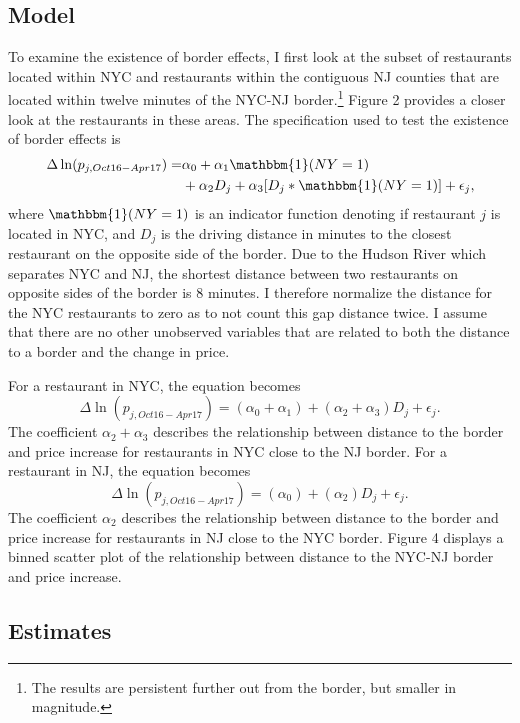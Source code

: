 \documentclass[11pt]{article}
\begin{document}
\subsection{Model}
 To examine the existence of border effects, I first look at the subset of restaurants located within NYC and restaurants within the contiguous NJ counties that are located within twelve minutes of the NYC-NJ border.\footnote{The results are persistent further out from the border, but smaller in magnitude.} Figure 2 provides a closer look at the restaurants in these areas. The specification used to test the existence of border effects is  
\begin{equation}
\begin{split}
\Delta \ln (p_{j,Oct16-Apr17})  = & \alpha_0 + \alpha_1  \mathbbm{1}(NY=1)  \\
& + \alpha_2 D_{j} + \alpha_3[D_j * \mathbbm{1}(NY=1)]  + \epsilon_{j}, 
\end{split}
\end{equation}
where  $\mathbbm{1}(NY=1)$ is an indicator function denoting if restaurant $j$ is located in NYC, and $D_j$ is the driving distance in minutes to the closest restaurant on the opposite side of the border. Due to the Hudson River which separates NYC and NJ, the shortest distance between two restaurants on opposite sides of the border is 8 minutes. I therefore normalize the distance for the NYC restaurants to zero as to not count this gap distance twice. I assume that there are no other unobserved variables that are related to both the distance to a border and the change in price. 

For a restaurant in NYC, the equation becomes 
$$ \Delta \ln (p_{j,Oct16-Apr17})  = (\alpha_0 +\alpha_1) +  (\alpha_2 + \alpha_3) D_j  + \epsilon_{j}.   $$
The coefficient $\alpha_2 + \alpha_3$ describes the relationship between distance to the border and price increase for restaurants in NYC close to the NJ border. For a restaurant in NJ, the equation becomes 
$$
\Delta \ln (p_{j,Oct16-Apr17})  = (\alpha_0 ) +  (\alpha_2 ) D_j  + \epsilon_{j}.
$$
The coefficient $\alpha_2$ describes the relationship between distance to the border and price increase for restaurants in NJ close to the NYC border. Figure 4 displays a binned scatter plot of the relationship between distance to the NYC-NJ border and price increase. 

\subsection{Estimates}
\end{document}
